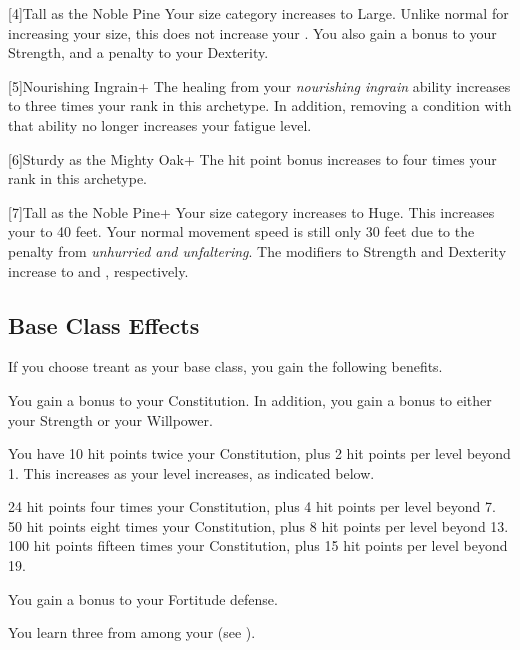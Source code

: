     [4]{Tall as the Noble Pine} Your size category increases to Large.
      Unlike normal for increasing your size, this does not increase your .
      You also gain a  bonus to your Strength, and a  penalty to your Dexterity.

    [5]{Nourishing Ingrain+} The healing from your \textit{nourishing ingrain} ability increases to three times your rank in this archetype.
      In addition, removing a condition with that ability no longer increases your fatigue level.

    [6]{Sturdy as the Mighty Oak+} The hit point bonus increases to four times your rank in this archetype.

    [7]{Tall as the Noble Pine+} Your size category increases to Huge.
      This increases your  to 40 feet.
      Your normal movement speed is still only 30 feet due to the penalty from \textit{unhurried and unfaltering}.
      The modifiers to Strength and Dexterity increase to  and , respectively.

  \subsection{Base Class Effects}
    If you choose treant as your base class, you gain the following benefits.

      You gain a  bonus to your Constitution. In addition, you gain a  bonus to either your Strength or your Willpower.

      You have 10 hit points \add twice your Constitution, plus 2 hit points per level beyond 1.
      This increases as your level increases, as indicated below.
      \begin{itemize}
         24 hit points \add four times your Constitution, plus 4 hit points per level beyond 7.
         50 hit points \add eight times your Constitution, plus 8 hit points per level beyond 13.
         100 hit points \add fifteen times your Constitution, plus 15 hit points per level beyond 19.
      \end{itemize}

      You gain a  bonus to your Fortitude defense.

      You learn three  from among your  (see ).

